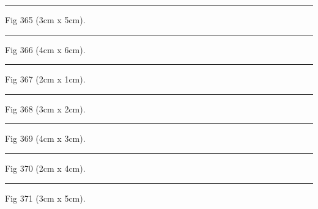 \documentclass[a4paper,11pt]{article}
\begin{document}
\begin{swarmwrap}%
  \begin{minipage}[t]{3cm}
    \centering
    \rule{\linewidth}{5cm}
    {\footnotesize Fig 365 (3cm x 5cm).}
  \end{minipage}%
\end{swarmwrap}%
\swarmwrapnext
\lipsum[65]%

\begin{swarmwrap}%
  \begin{minipage}[t]{4cm}
    \centering
    \rule{\linewidth}{6cm}
    {\footnotesize Fig 366 (4cm x 6cm).}
  \end{minipage}%
\end{swarmwrap}%
\swarmwrapnext
\lipsum[66]%

\begin{swarmwrap}%
  \begin{minipage}[t]{2cm}
    \centering
    \rule{\linewidth}{1cm}
    {\footnotesize Fig 367 (2cm x 1cm).}
  \end{minipage}%
\end{swarmwrap}%
\swarmwrapnext
\lipsum[67]%

\begin{swarmwrap}%
  \begin{minipage}[t]{3cm}
    \centering
    \rule{\linewidth}{2cm}
    {\footnotesize Fig 368 (3cm x 2cm).}
  \end{minipage}%
\end{swarmwrap}%
\swarmwrapnext
\lipsum[68]%

\begin{swarmwrap}%
  \begin{minipage}[t]{4cm}
    \centering
    \rule{\linewidth}{3cm}
    {\footnotesize Fig 369 (4cm x 3cm).}
  \end{minipage}%
\end{swarmwrap}%
\swarmwrapnext
\lipsum[69]%

\begin{swarmwrap}%
  \begin{minipage}[t]{2cm}
    \centering
    \rule{\linewidth}{4cm}
    {\footnotesize Fig 370 (2cm x 4cm).}
  \end{minipage}%
\end{swarmwrap}%
\swarmwrapnext
\lipsum[70]%

\begin{swarmwrap}%
  \begin{minipage}[t]{3cm}
    \centering
    \rule{\linewidth}{5cm}
    {\footnotesize Fig 371 (3cm x 5cm).}
  \end{minipage}%
\end{swarmwrap}%
\swarmwrapnext
\lipsum[71]%
\end{document}
